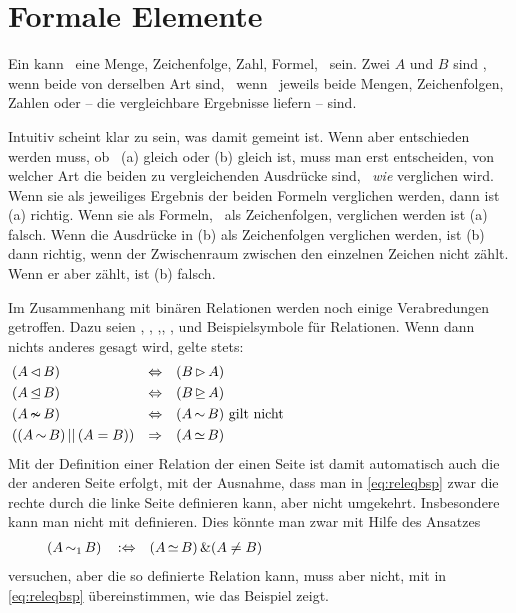 \section{Formale Elemente}%
\label{sec:Formalelement}

Ein \emph{} kann \textzB\ eine Menge, Zeichenfolge, Zahl, Formel, \textusw\ sein.
Zwei  $A$ und $B$ sind \emph{}, wenn beide von derselben Art sind, \textdh\ wenn \textzB\ jeweils beide Mengen, Zeichenfolgen, Zahlen oder  -- die vergleichbare Ergebnisse liefern -- sind.

Intuitiv scheint klar zu sein, was damit  gemeint ist.
Wenn aber entschieden werden muss, ob \textzB\ (a)  gleich  oder (b)  gleich  ist, muss man erst entscheiden, von welcher Art die beiden zu vergleichenden Ausdrücke sind, \textdh\ \emph{wie} verglichen wird.
Wenn sie als jeweiliges Ergebnis der beiden Formeln verglichen werden, dann ist (a) richtig.
Wenn sie als Formeln, \textdh\ als Zeichenfolgen, verglichen werden ist (a) falsch.
Wenn die Ausdrücke in (b) als Zeichenfolgen verglichen werden, ist (b) dann richtig, wenn der Zwischenraum zwischen den einzelnen Zeichen nicht zählt.
Wenn er aber zählt, ist (b) falsch.

Im Zusammenhang mit binären Relationen werden noch einige Verabredungen getroffen.
Dazu seien , , ,, ,  und  Beispielsymbole für Relationen.
Wenn dann nichts anderes gesagt wird, gelte stets:
\begin{align}
	& (A \operatorname{\lhd}   B)                   & \operatorname{\Leftrightarrow} & \quad (B \operatorname{\rhd}   A)
	\label{eq:lrrelbsp}   \\
	& (A \operatorname{\unlhd} B)                   & \operatorname{\Leftrightarrow} & \quad (B \operatorname{\unrhd} A)
	\label{eq:lrreleqbsp} \\
	&  (A \operatorname{\nsim}  B)                   & \operatorname{\Leftrightarrow} & \quad (A \operatorname{\sim}    B)
	\text{ gilt nicht}
	\label{eq:relnbsp}    \\
	& ((A \operatorname{\sim}   B) \operatorname{||\,} (A = B)) & \operatorname{\Rightarrow}   & \quad (A \operatorname{\simeq}  B)
	\label{eq:releqbsp}   &&&&&&&&&&&&&&&&&&&&&&&&&&&&&&
\end{align}
%
Mit der Definition einer Relation der einen Seite ist damit automatisch auch die der anderen Seite erfolgt, mit der Ausnahme, dass man in \eqref{eq:releqbsp} zwar die rechte durch die linke Seite definieren kann, aber nicht umgekehrt.
Insbesondere kann man \symqt{$\relbsp$} nicht mit \symqt{$\releqbsp$} definieren.
Dies könnte man zwar mit Hilfe des Ansatzes
\begin{align}
	& (A \operatorname{\operatorname{\sim}_1} B) && \operatorname{:\!\operatorname{\Leftrightarrow}} & (A \operatorname{\simeq} B) \operatorname{\&} (A \ne B)
	\label{eq:relbsp} &&&&&&&&&&&&&&&&&&&&&&&&&&&&&&
\end{align}
versuchen, aber die so definierte Relation \symqt{$\relBsp$} kann, muss aber nicht, mit \symqt{$\relbsp$} in \eqref{eq:releqbsp} übereinstimmen, wie das Beispiel  zeigt.

